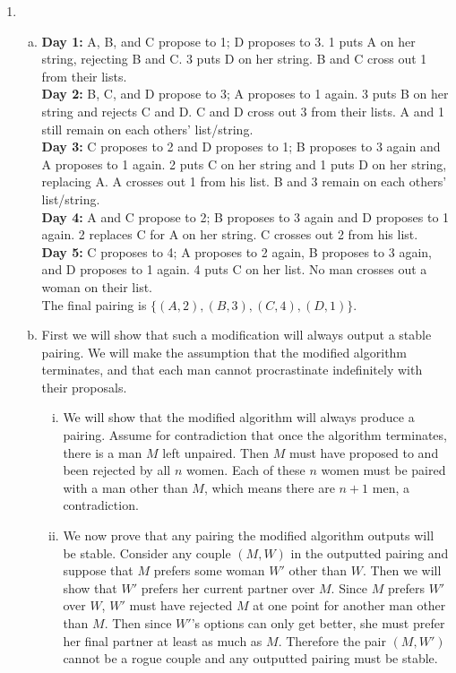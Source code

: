 \begin{enumerate}
    \item\begin{enumerate}[(a)]
        \item \textbf{Day 1:} A, B, and C propose to 1; D proposes to 3. 1 puts A on her string, rejecting B and C. 3 puts D on her string. B and C cross out 1 from their lists. \\
        \textbf{Day 2:} B, C, and D propose to 3; A proposes to 1 again. 3 puts B on her string and rejects C and D. C and D cross out 3 from their lists. A and 1 still remain on each others' list/string.\\
        \textbf{Day 3:} C proposes to 2 and D proposes to 1; B proposes to 3 again and A proposes to 1 again. 2 puts C on her string and 1 puts D on her string, replacing A. A crosses out 1 from his list. B and 3 remain on each others' list/string. \\
        \textbf{Day 4:} A and C propose to 2; B proposes to 3 again and D proposes to 1 again. 2 replaces C for A on her string. C crosses out 2 from his list. \\
        \textbf{Day 5:} C proposes to 4; A proposes to 2 again, B proposes to 3 again, and D proposes to 1 again. 4 puts C on her list. No man crosses out a woman on their list. \\
        The final pairing is $\{(A,2),(B,3),(C,4),(D,1)\}$.
        \item First we will show that such a modification will always output a stable pairing. We will make the assumption that the modified algorithm terminates, and that each man cannot procrastinate indefinitely with their proposals. 
        \begin{enumerate}[(i)]
        \setlength{\parskip}{10pt}
        \item We will show that the modified algorithm will always produce a pairing. Assume for contradiction that once the algorithm terminates, there is a man $M$ left unpaired. Then $M$ must have proposed to and been rejected by all $n$ women. Each of these $n$ women must be paired with a man other than $M$, which means there are $n+1$ men, a contradiction.
        
        \item We now prove that any pairing the modified algorithm outputs will be stable. Consider any couple $(M, W)$ in the outputted pairing and suppose that $M$ prefers some woman $W'$ other than $W$. Then we will show that $W'$ prefers her current partner over $M$. Since $M$ prefers $W'$ over $W$, $W'$ must have rejected $M$ at one point for another man other than $M$. Then since $W'$'s options can only get better, she must prefer her final partner at least as much as $M$. Therefore the pair $(M, W')$ cannot be a rogue couple and any outputted pairing must be stable.


\end{enumerate}
\end{enumerate}
\end{enumerate}
